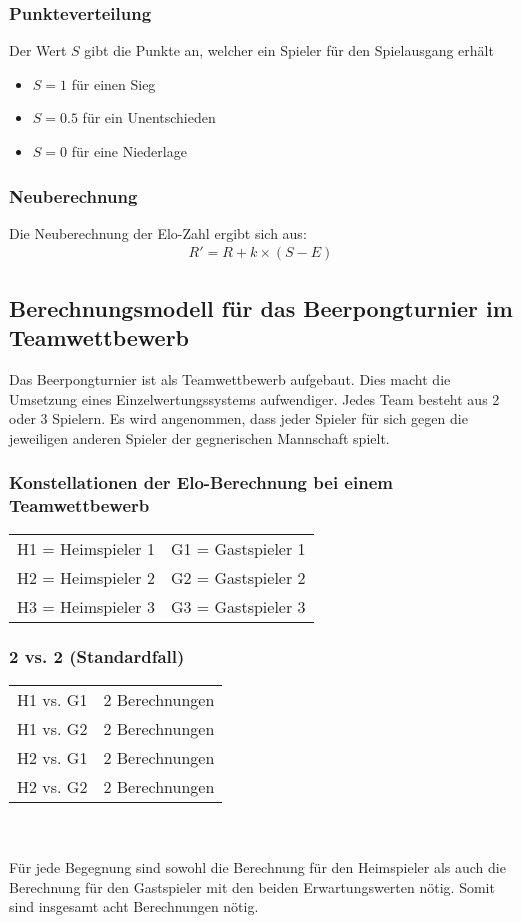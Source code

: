 \documentclass[a4paper, 12pt]{article}
\begin{document}
\subsubsection{Punkteverteilung}
Der Wert \(S\) gibt die Punkte an, welcher ein Spieler für den Spielausgang erhält
\begin{itemize}
\item \(S = 1\) für einen Sieg
\item \(S = 0.5\) für ein Unentschieden
\item \(S = 0\) für eine Niederlage
\end{itemize}

\subsubsection{Neuberechnung}
Die Neuberechnung der Elo-Zahl ergibt sich aus:
\begin{align}
R' = R + k\times(S-E)
\end{align}

\subsection{Berechnungsmodell für das Beerpongturnier im Teamwettbewerb}
Das Beerpongturnier ist als Teamwettbewerb aufgebaut. Dies macht die Umsetzung eines Einzelwertungssystems aufwendiger. Jedes Team besteht aus 2 oder 3 Spielern.
Es wird angenommen, dass jeder Spieler für sich gegen die jeweiligen anderen Spieler der gegnerischen Mannschaft spielt.
\subsubsection{Konstellationen der Elo-Berechnung bei einem Teamwettbewerb}
\begin{tabular}{lr}
H1 = Heimspieler 1 & G1 = Gastspieler 1 \\
H2 = Heimspieler 2 & G2 = Gastspieler 2 \\
H3 = Heimspieler 3 & G3 = Gastspieler 3 \\
\end{tabular}
\subsubsection{2 vs. 2 (Standardfall)}
\begin{tabular}[h]{ll}
H1 vs. G1 & 2 Berechnungen \\
H1 vs. G2 & 2 Berechnungen \\
H2 vs. G1 & 2 Berechnungen \\
H2 vs. G2 & 2 Berechnungen \\
\end{tabular}
\\
\\Für jede Begegnung sind sowohl die Berechnung für den Heimspieler als auch die Berechnung für den Gastspieler mit den beiden Erwartungswerten nötig. Somit sind insgesamt acht Berechnungen nötig.
\end{document}

